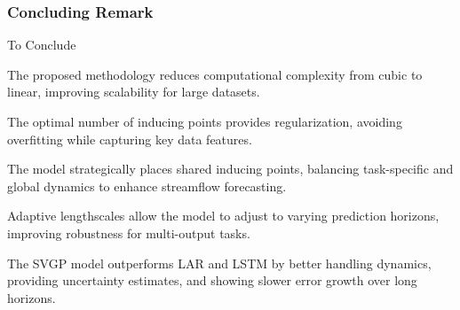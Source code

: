 \subsubsection{Concluding Remark}
\begin{frame}{To Conclude} 
		\begin{block}{}
		The proposed methodology reduces computational complexity from cubic to linear, improving scalability for large datasets. 
		\end{block}
		
		\begin{block}{}
		The optimal number of inducing points provides regularization, avoiding overfitting while capturing key data features. 
		\end{block}
		
		\begin{block}{}
		The model strategically places shared inducing points, balancing task-specific and global dynamics to enhance streamflow forecasting. 
		\end{block}
		
		\begin{block}{}
		Adaptive lengthscales allow the model to adjust to varying prediction horizons, improving robustness for multi-output tasks. 
		\end{block}
		
		\begin{block}{} 
		The SVGP model outperforms LAR and LSTM by better handling dynamics, providing uncertainty estimates, and showing slower error growth over long horizons.
		\end{block}
	 \end{frame}



